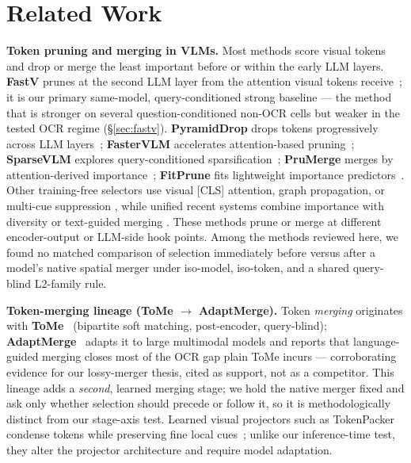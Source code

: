 \documentclass[journal]{IEEEtran}
\begin{document}
\section{Related Work}\label{sec:related}

\textbf{Token pruning and merging in VLMs.} Most methods score visual tokens and
drop or merge the least important before or within the early LLM layers.
\textbf{FastV} prunes at the second LLM layer from the attention visual tokens
receive~\cite{chen2024fastv}; it is our primary same-model, query-conditioned
strong baseline --- the method that is stronger on several question-conditioned
non-OCR cells but weaker in the tested OCR regime (\S\ref{sec:fastv}).
\textbf{PyramidDrop} drops tokens progressively across LLM
layers~\cite{xing2024pyramiddrop}; \textbf{FasterVLM} accelerates
attention-based pruning~\cite{zhang2024fastervlm}; \textbf{SparseVLM} explores
query-conditioned sparsification~\cite{zhang2024sparsevlm}; \textbf{PruMerge}
merges by attention-derived importance~\cite{shang2024prumerge};
\textbf{FitPrune} fits lightweight importance
predictors~\cite{ye2024fitprune}. Other training-free selectors use visual
{[CLS]} attention, graph propagation, or multi-cue suppression
\cite{wang2024vtccls,jiang2025gprune,luan2025adaptprune}, while unified recent
systems combine importance with diversity or text-guided merging
\cite{yu2026visiontrim,baek2026agilepruner,fang2026prunesid}. These methods
prune or merge at different
encoder-output or LLM-side hook points. Among the methods reviewed here, we
found no matched comparison of selection immediately before versus after a
model's native spatial merger under iso-model, iso-token, and a shared
query-blind L2-family rule.

\textbf{Token-merging lineage (ToMe $\to$ AdaptMerge).} Token \emph{merging}
originates with \textbf{ToMe}~\cite{bolya2023tome} (bipartite soft matching,
post-encoder, query-blind); \textbf{AdaptMerge}~\cite{islam2025adaptmerge}
adapts it to large multimodal models and reports that language-guided merging
closes most of the OCR gap plain ToMe incurs --- corroborating evidence for our
lossy-merger thesis, cited as support, not as a competitor. This lineage adds a
\emph{second}, learned merging stage; we hold the native merger fixed and ask
only whether selection should precede or follow it, so it is methodologically
distinct from our stage-axis test.
Learned visual projectors such as TokenPacker condense tokens while preserving
fine local cues~\cite{li2024tokenpacker}; unlike our inference-time test, they
alter the projector architecture and require model adaptation.
\end{document}
